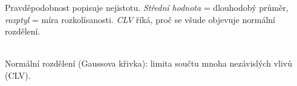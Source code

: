 \ucivo
\begin{intuice}
Pravděpodobnost popisuje nejistotu. \emph{Střední hodnota} = dlouhodobý průměr, \emph{rozptyl} =
míra rozkolísanosti. \emph{CLV} říká, proč se všude objevuje normální rozdělení.
\end{intuice}

\begin{center}
\\[-4pt]
{\scriptsize Normální rozdělení (Gaussova křivka): limita součtu mnoha nezávislých vlivů (CLV).}
\end{center}

